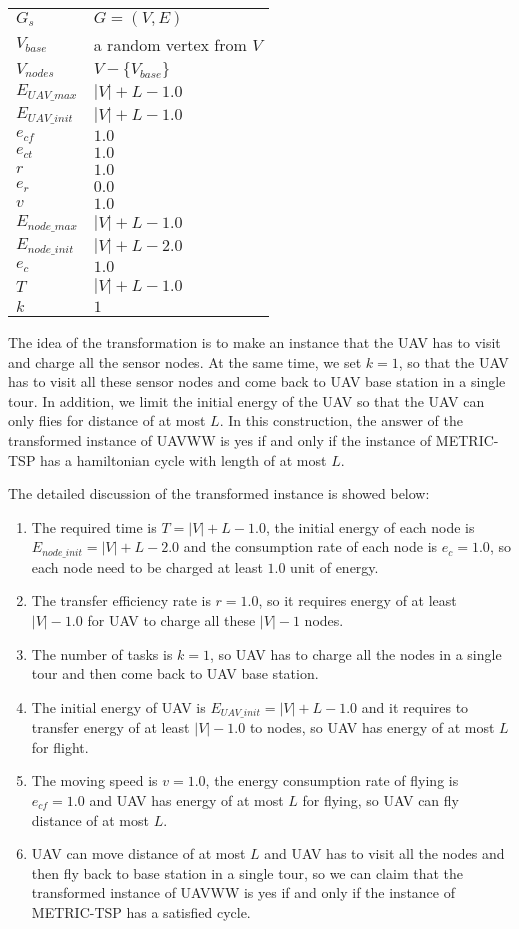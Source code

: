 \documentclass[11pt]{article}
\begin{document}
\begin{tabular}{| l | l |}
\hline
$G_s$ & $G = (V, E)$ \\
$V_{base}$ & a random vertex from $V$ \\
$V_{nodes}$ & $V - \{V_{base}\}$ \\
$E_{UAV\_max}$ & $|V| + L - 1.0$ \\
$E_{UAV\_init}$ & $|V| + L - 1.0$ \\
$e_{cf}$ & $1.0$ \\
$e_{ct}$ & $1.0$ \\
$r$ & $1.0$ \\
$e_r$ & $0.0$ \\
$v$ & $1.0$ \\
$E_{node\_max}$ & $|V| + L - 1.0$ \\
$E_{node\_init}$ & $|V| + L - 2.0$ \\
$e_{c}$ & $1.0$ \\
$T$ & $|V| + L - 1.0$ \\
$k $ & $1$ \\
\hline
\end{tabular}

The idea of the transformation is to make an instance that the UAV has to visit and charge all the sensor nodes. At the same time, we set $k = 1$, so that the UAV has to visit all these sensor nodes and come back to UAV base station in a single tour. In addition, we limit the initial energy of the UAV so that the UAV can only flies for distance of at most $L$. In this construction, the answer of the transformed instance of UAVWW is yes if and only if the instance of METRIC-TSP has a hamiltonian cycle with length of at most $L$.

The detailed discussion of the transformed instance is showed below:
\begin{enumerate}[noitemsep]
\item The required time is $T = |V| + L - 1.0$, the initial energy of each node is $E_{node\_init} = |V| + L - 2.0$ and the consumption rate of each node is $e_{c} = 1.0$, so each node need to be charged at least $1.0$ unit of energy. \item The transfer efficiency rate is $r = 1.0$, so it requires energy of at least $|V| - 1.0$ for UAV to charge all these $|V| - 1$ nodes.
\item The number of tasks is $k = 1$, so UAV has to charge all the nodes in a single tour and then come back to UAV base station.
\item The initial energy of UAV is $E_{UAV\_init} = |V| + L - 1.0$ and it requires to transfer energy of at least $|V| - 1.0$ to nodes, so UAV has  energy of at most $L$ for flight. 
\item The moving speed is $v = 1.0$, the energy consumption rate of flying is  $e_{cf} = 1.0$ and UAV has energy of at most $L$ for flying, so UAV can fly distance of at most $L$.
\item UAV can move distance of at most $L$ and UAV has to visit all the nodes and then fly back to base station in a single tour, so we can claim that the transformed instance of UAVWW is yes if and only if the instance of METRIC-TSP has a satisfied cycle.
\end{enumerate}
\end{document}
